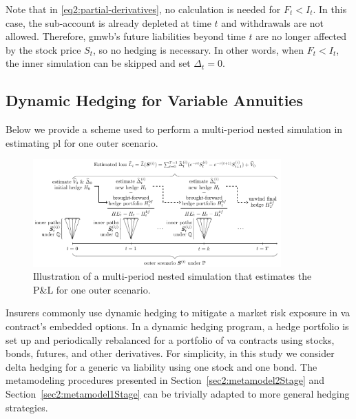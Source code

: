 Note that in \eqref{eq2:partial-derivatives}, no calculation is needed for $F_t < I_t$. 
In this case, the sub-account is already depleted at time $t$ and withdrawals are not allowed.
Therefore, \gls{gmwb}'s future liabilities beyond time $t$ are no longer affected by the stock price $S_t$, so no hedging is necessary.
In other words, when $F_t < I_t$, the inner simulation can be skipped and set $\Delta_t = 0$.

\subsection{Dynamic Hedging for Variable Annuities}\label{subsec:dynamicHedge}

Below we provide a scheme used to perform a multi-period nested simulation in estimating \gls{pl} for one outer scenario.

\begin{figure}[ht]
    \centering
    \includegraphics[width=0.85\textwidth]{./project2/figures/sns.pdf}
    \caption{Illustration of a multi-period nested simulation that estimates the P\&L for one outer scenario.}
    \label{fig2:illustration}
\end{figure}

Insurers commonly use dynamic hedging to mitigate a market risk exposure in \gls{va} contract's embedded options.
In a dynamic hedging program, a hedge portfolio is set up and periodically rebalanced for a portfolio of \gls{va} contracts using stocks, bonds, futures, and other derivatives.
For simplicity, in this study we consider delta hedging for a generic \gls{va} liability using one stock and one bond.
The metamodeling procedures presented in Section~\ref{sec2:metamodel2Stage} and Section~\ref{sec2:metamodel1Stage} can be trivially adapted to more general hedging strategies.

